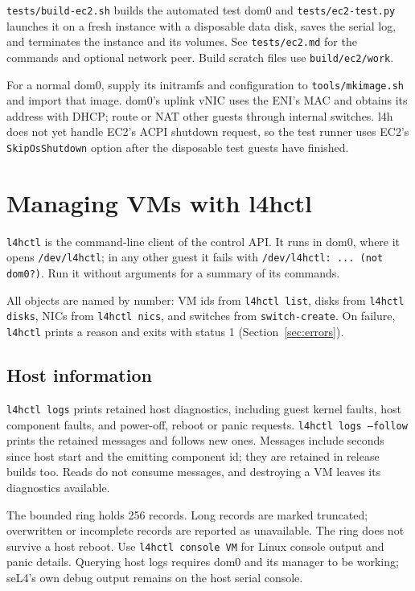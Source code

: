 \documentclass[11pt,a4paper]{report}
\newcommand{\cmd}[1]{\texttt{#1}}
\newcommand{\file}[1]{\texttt{#1}}
\begin{document}
\file{tests/build-ec2.sh} builds the automated test dom0 and
\file{tests/ec2-test.py} launches it on a fresh instance with a disposable
data disk, saves the serial log, and terminates the instance and its
volumes. See \file{tests/ec2.md} for the commands and optional network
peer. Build scratch files use \file{build/ec2/work}.

For a normal dom0, supply its initramfs and configuration to
\file{tools/mkimage.sh} and import that image. dom0's uplink vNIC uses
the ENI's MAC and obtains its address with DHCP; route or NAT other
guests through internal switches. l4h does not yet handle EC2's ACPI
shutdown request, so the test runner uses EC2's \texttt{SkipOsShutdown}
option after the disposable test guests have finished.

\chapter{Managing VMs with l4hctl}
\label{ch:l4hctl}

\cmd{l4hctl} is the command-line client of the control API. It runs in
dom0, where it opens \file{/dev/l4hctl}; in any other guest it fails with
\texttt{/dev/l4hctl: ... (not dom0?)}. Run it without arguments for a
summary of its commands.

All objects are named by number: VM ids from \cmd{l4hctl list}, disks from
\cmd{l4hctl disks}, NICs from \cmd{l4hctl nics}, and switches from
\cmd{switch-create}. On failure, \cmd{l4hctl} prints a reason and exits
with status 1 (Section~\ref{sec:errors}).

\section{Host information}

\cmd{l4hctl logs} prints retained host diagnostics, including guest kernel
faults, host component faults, and power-off, reboot or panic requests.
\cmd{l4hctl logs --follow} prints the retained messages and follows new
ones. Messages include seconds since host start and the emitting component
id; they are retained in release builds too. Reads do not consume messages,
and destroying a VM leaves its diagnostics available.

The bounded ring holds 256 records. Long records are marked truncated;
overwritten or incomplete records are reported as unavailable. The ring
does not survive a host reboot. Use \cmd{l4hctl console VM} for Linux console
output and panic details. Querying host logs requires dom0 and its manager
to be working; seL4's own debug output remains on the host serial console.
\end{document}
